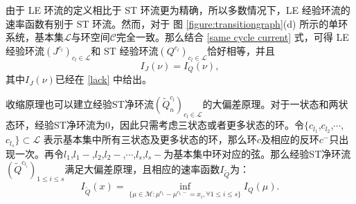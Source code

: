 由于 LE 环流的定义相比于 ST 环流更为精确，所以多数情况下，LE 经验环流的速率函数有别于 ST 环流。然而，对于 图 \ref{figure:transitiongraph}(d) 所示的单环系统，基本集$\mathcal{L}$与环空间$\mathcal{C}$完全一致。那么结合 \eqref{same cycle current} 式，可得 LE 经验环流$(J^{c_l})_{c_l\in\mathcal{L}}$和 ST 经验环流$(Q^{c_l})_{c_l\in\mathcal{L}}$恰好相等，并且 
\begin{equation*}
	I_J(\nu) = I_Q(\nu),
\end{equation*}
其中$I_J(\nu)$已经在 \eqref{lack} 中给出。

收缩原理也可以建立经验ST净环流$(\tilde{Q}^{c_l}_n)_{c_l\in\mathcal{L}}$的大偏差原理。对于一状态和两状态环，经验ST净环流为0，因此只需考虑三状态或者更多状态的环。令$\{c_{l_1}$,$c_{l_2}$,$\cdots$,$c_{l_s}\} \subset \mathcal{L}$ 表示基本集中所有三状态及更多状态的环，那么环$c$及相应的反环$c^-$只出现一次。再令$l_1$,$l_1-$,$l_2$,$l_2-$,$\cdots$,$l_s$,$l_s-$为基本集中环对应的弦。那么经验ST净环流$(\tilde{Q}^{c_{l_i}})_{1\le i\le s}$满足大偏差原理，且相应的速率函数$I_{\tilde{Q}}$为：
\begin{equation}\label{I_Q2}
	I_{\tilde{Q}}(x)=\inf_{\{\mu\in\mathcal{M}:\mu^{c_{l_{i}}}-\mu^{c_{l_{i}}-}= x_i,\forall 1\le i\le s\}}I_Q(\mu).
\end{equation}